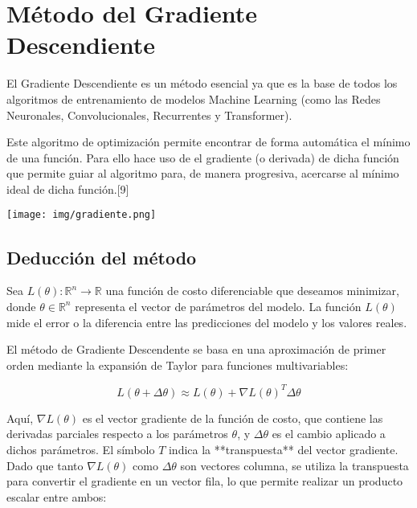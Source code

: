 \documentclass[12pt, letterpaper,conference]{IEEEtran}
\begin{document}
\vspace{0.5cm}


\section{Método del Gradiente Descendiente}

\vspace{0.25cm}


El Gradiente Descendiente es un método esencial ya que es la base de todos los algoritmos de entrenamiento de modelos Machine Learning (como las Redes Neuronales, Convolucionales, Recurrentes y Transformer).

Este algoritmo de optimización permite encontrar de forma automática el mínimo de una función. Para ello hace uso de el gradiente (o derivada) de dicha función que permite guiar al algoritmo para, de manera progresiva, acercarse al mínimo ideal de dicha función.[9]

\vspace{0.3cm}

\texttt{[image: img/gradiente.png]}



\vspace{0.25cm}

\subsection{Deducción del método}
Sea \( L(\theta): \mathbb{R}^n \rightarrow \mathbb{R} \) una función de costo diferenciable que deseamos minimizar, donde \( \theta \in \mathbb{R}^n \) representa el vector de parámetros del modelo. La función \( L(\theta) \) mide el error o la diferencia entre las predicciones del modelo y los valores reales.

El método de Gradiente Descendente se basa en una aproximación de primer orden mediante la expansión de Taylor para funciones multivariables:

\[
L(\theta + \Delta \theta) \approx L(\theta) + \nabla L(\theta)^T \Delta \theta
\]

Aquí, \( \nabla L(\theta) \) es el vector gradiente de la función de costo, que contiene las derivadas parciales respecto a los parámetros $\theta$, y \( \Delta \theta \) es el cambio aplicado a dichos parámetros. El símbolo \( T \) indica la **transpuesta** del vector gradiente. Dado que tanto \( \nabla L(\theta) \) como \( \Delta \theta \) son vectores columna, se utiliza la transpuesta para convertir el gradiente en un vector fila, lo que permite realizar un producto escalar entre ambos:
\end{document}
